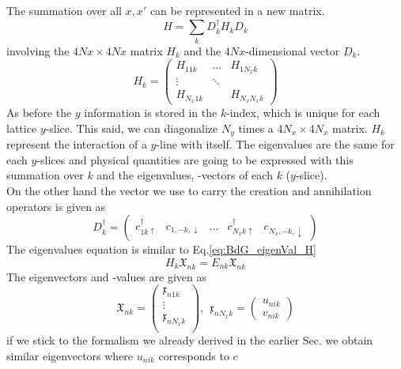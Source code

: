 \documentclass[../main.tex]{subfile}
\begin{document}
The summation over all $x,x'$ can be represented in a new matrix.
\[
    H = \sum_k D_k^{\dagger} H_k D_k
\]
involving the $4Nx \times 4Nx$ matrix $H_k$ and the $4Nx$-dimensional vector $D_k$.
\[
    H_k = \begin{pmatrix}
        H_{11k} &\dots & H_{1N_xk}\\
        \vdots&\ddots&\\
        H_{N_x1k} & & H_{N_xN_xk}
    \end{pmatrix}
\]
As before the $y$ information is stored in the $k$-index, which is unique for each lattice $y$-slice. This said, we 
can diagonalize $N_y$ times a $4N_x \times 4N_x$ matrix. $H_k$ represent the interaction of a $y$-line with itself.
The eigenvalues are the same for each $y$-slices and physical
quantities are going to be expressed with this summation over $k$ and the eigenvalues, -vectors of each $k$ ($y$-slice).\\

On the other hand the vector we use to carry the creation and annihilation operators is given as 
\[
    D_k^{\dagger} = \begin{pmatrix}
        c^{\dagger}_{1k\uparrow} & c_{1,-k,\downarrow}& \dots &c^{\dagger}_{N_x k\uparrow} & c_{N_x,-k,\downarrow}
    \end{pmatrix}
\]
The eigenvalues equation is similar to Eq.\ref{eq:BdG_eigenVal_H}
\begin{equation}\label{eq:BdG_eigenVal_H_k}
    H_k \mathfrak{X}_{nk} = E_{nk} \mathfrak{X}_{nk}
\end{equation}
The eigenvectors and -values are given as
\begin{equation*}
    \mathfrak{X}_{nk} = \begin{pmatrix}
        \mathfrak{x}_{n1k}\\
        \vdots\\
        \mathfrak{x}_{nN_xk}\\
    \end{pmatrix},~~ \mathfrak{x}_{nN_xk} = \begin{pmatrix}
        u_{nik}\\
        v_{nik}
    \end{pmatrix}
\end{equation*}
if we stick to the formalism we already derived in the earlier Sec.\label{sec:Diagonalization} we obtain similar 
eigenvectors where $u_{nik}$ corresponds to $c$ 
\end{document}
